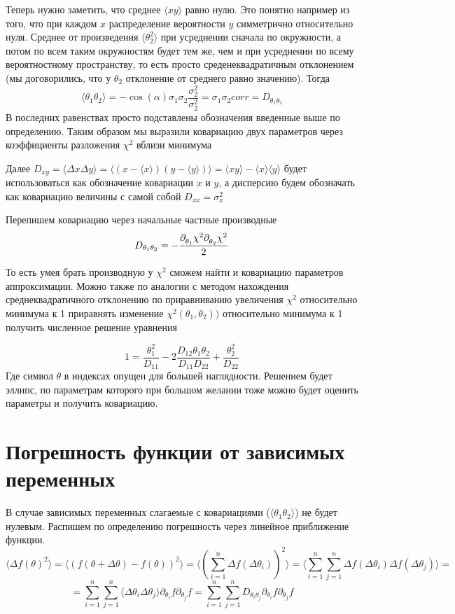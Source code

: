 \documentclass[a4paper,12pt]{article}
\renewcommand{\d}[2][ ]{%
\partial^{#1}_{#2}}
\begin{document}
Теперь нужно заметить, что среднее $\langle xy \rangle$ равно нулю. Это понятно например из того,
что при каждом $x$ распределение вероятности $y$ симметрично относительно нуля.
Среднее от произведения $\langle \theta_2^2\rangle$ при усреднении сначала по окружности, а потом
по всем таким окружностям будет тем же, чем и при усреднении по всему вероятностному пространству, то есть
просто среденеквадратичным отклонением (мы договорились, что у $\theta_2$ отклонение от среднего равно значению).
Тогда
\[ \langle \theta_1\theta_2\rangle = -\cos(\alpha)\sigma_1\sigma_2 \frac{\sigma_2^2}{\sigma_2^2} =
\sigma_1\sigma_2 corr = D_{\theta_1\theta_2} \]
В последних равенствах просто подставлены обозначения введенные выше по определению.
Таким образом мы выразили ковариацию двух параметров через коэффициенты разложения $\chi^2$ вблизи минимума

Далее $D_{xy} = \langle \Delta x \Delta y \rangle = \langle (x-\langle x\rangle)(y-\langle y\rangle) \rangle = \langle xy\rangle - \langle x\rangle \langle y \rangle$ будет использоваться как обозначение ковариации $x$ и $y$,
а дисперсию будем обозначать как ковариацию величины с самой собой $D_{xx} = \sigma_x^2$

Перепишем ковариацию через начальные частные производные
\[  D_{\theta_1\theta_2} = -\frac{\d{\theta_1}\chi^2 \d{\theta_2}\chi^2}{2} \]

То есть умея брать производную у $\chi^2$ сможем найти и ковариацию параметров аппроксимации. Можно также по
аналогии с методом нахождения среднеквадратичного отклонению по приравниванию увеличения $\chi^2$ относительно
минимума к 1 приравнять изменение $\chi^2(\theta_1, \theta_2))$ относительно минимума к 1 получить численное решение уравнения

\[1 =
\frac{\theta_1^2}{D_{11}} - 2 \frac{D_{12}\theta_1\theta_2}{D_{11} D_{22}} + \frac{\theta_2^2}{D_{22}}\]
Где символ $\theta$ в индексах опущен для большей наглядности. Решением будет эллипс, по параметрам которого при большом
желании тоже можно будет оценить параметры и получить ковариацию.

\section{Погрешность функции от зависимых переменных}

В случае зависимых переменных  слагаемые с ковариациями ($\langle \theta_1\theta_2\rangle$)
не будет нулевым. Распишем по определению погрешность через линейное приближение функции.
\[ \langle \Delta f(\theta)^2 \rangle = 
\langle (f(\theta + \Delta \theta)-f(\theta))^2\rangle
= \langle (\sum_{i=1}^{n} \Delta f(\Delta \theta_i))^2\rangle
= \langle \sum_{i=1}^{n}\sum_{j=1}^{n} \Delta f(\Delta \theta_i)\Delta f(\Delta \theta_j) \rangle =\]
\[= \sum_{i=1}^{n}\sum_{j=1}^{n} \langle\Delta\theta_i \Delta\theta_j \rangle \d{\theta_i} f \d{\theta_j} f 
= \sum_{i=1}^{n}\sum_{j=1}^{n} D_{\theta_i\theta_j} \d{\theta_i} f \d{\theta_j} f \]
\end{document}
